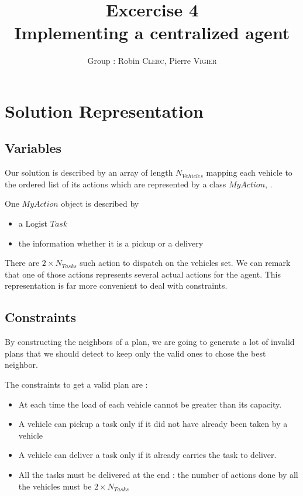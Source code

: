 \documentclass[11pt]{article}
\title{\bf Excercise 4\\ Implementing a centralized agent}
\author{Group \textnumero 3 : Robin \textsc{Clerc}, Pierre \textsc{Vigier}}
\begin{document}
\maketitle

\section{Solution Representation}

\subsection{Variables}
Our solution is described by an array of length $N_{Vehicles}$ mapping each vehicle to the ordered list of its actions which are represented by a class $MyAction$, .

One $MyAction$ object is described by
\begin{itemize}
    \item a Logist $Task$
    \item the information whether it is a pickup or a delivery
\end{itemize}
There are $2 \times N_{Tasks}$ such action to dispatch on the vehicles set. We can remark that one of those actions represents several actual actions for the agent. This representation is far more convenient to deal with constraints.

\subsection{Constraints}

By constructing the neighbors of a plan, we are going to generate a lot of invalid plans that we should detect to keep only the valid ones to chose the best neighbor.

The constraints to get a valid plan are :
\begin{itemize}
    \item At each time the load of each vehicle cannot be greater than its capacity.
    \item A vehicle can pickup a task only if it did not have already been taken by a vehicle
    \item A vehicle can deliver a task only if it already carries the task to deliver.
    \item All the tasks must be delivered at the end : the number of actions done by all the vehicles must be $2 \times N_{Tasks}$
\end{itemize}
\end{document}

